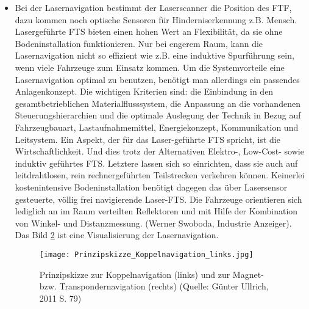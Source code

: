 \begin{itemize}
\begin{figure}[h!]
			\label{Prinzipskizze_Koppelnavigation_rechts}
	\end{figure}	
	\item Bei der Lasernavigation bestimmt der Laserscanner die Position des FTF, dazu kommen noch optische Sensoren f\"ur Hinderniserkennung z.B. Mensch. Lasergef\"uhrte FTS bieten einen hohen Wert an Flexibilit\"at, da sie ohne Bodeninstallation funktionieren. Nur bei engerem Raum, kann die Lasernavigation nicht so effizient wie z.B. eine induktive Spurf\"uhrung sein, wenn viele Fahrzeuge zum Einsatz kommen. Um die Systemvorteile eine Lasernavigation optimal zu benutzen, ben\"otigt man allerdings ein passendes Anlagenkonzept. Die wichtigen Kriterien sind: die Einbindung in den gesamtbetrieblichen Materialflusssystem, die Anpassung an die vorhandenen Steuerungshierarchien und die optimale Auslegung der Technik in Bezug auf Fahrzeugbauart, Lastaufnahmemittel, Energiekonzept, Kommunikation und Leitsystem. Ein Aspekt, der f\"ur das Laser-gef\"uhrte FTS spricht, ist die Wirtschaftlichkeit. Und dies trotz der Alternativen Elektro-, Low-Cost- sowie induktiv gef\"uhrtes FTS. Letztere lassen sich so einrichten, dass sie auch auf leitdrahtlosen, rein rechnergef\"uhrten Teilstrecken verkehren k\"onnen. Keinerlei kostenintensive Bodeninstallation ben\"otigt dagegen das \"uber Lasersensor gesteuerte, v\"ollig frei navigierende Laser-FTS. Die Fahrzeuge orientieren sich lediglich an im Raum verteilten Reflektoren und mit Hilfe der Kombination von Winkel- und Distanzmessung. (Werner Swoboda, Industrie Anzeiger). Das Bild \ref{Prinzipskizze_Koppelnavigation_links} ist eine Visualisierung der Lasernavigation.
	\begin{figure}[h!]
		\centering
		\texttt{[image: Prinzipskizze\_Koppelnavigation\_links.jpg]}
		\caption{Prinzipskizze zur Koppelnavigation (links) und zur Magnet- bzw. Transpondernavigation (rechts) (Quelle: G\"unter Ullrich, 2011 S. 79)}
		\label{Prinzipskizze_Koppelnavigation_links}
	\end{figure}


\end{itemize}
